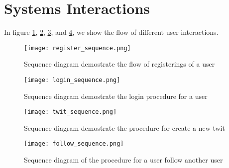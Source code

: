 \section{Systems Interactions}

%
In figure \ref{fig:register_sequence}, \ref{fig:login_sequence}, \ref{fig:twit_sequence}, and \ref{fig:follow_sequence}, we show the flow of different user interactions.


\begin{figure}[H]
	\centering
	\texttt{[image: register\_sequence.png]}
	\caption{Sequence diagram demostrate the flow of registerings of a user}
	\label{fig:register_sequence}
\end{figure}


\begin{figure}[H]
	\centering
	\texttt{[image: login\_sequence.png]}
	\caption{Sequence diagram demostrate the login procedure for a user}
	\label{fig:login_sequence}
\end{figure}

\begin{figure}[H]
	\centering
	\texttt{[image: twit\_sequence.png]}
	\caption{Sequence diagram demostrate the procedure for create a new twit}
	\label{fig:twit_sequence}
\end{figure}

\begin{figure}[H]
	\centering
	\texttt{[image: follow\_sequence.png]}
	\caption{Sequence diagram of the procedure for a user follow another user}
	\label{fig:follow_sequence}
\end{figure}

